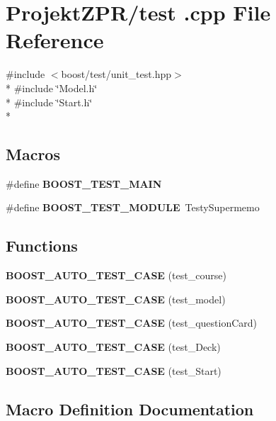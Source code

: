 \section{Projekt\-Z\-P\-R/test .cpp File Reference}
\label{test_01_8cpp}
{\ttfamily \#include $<$boost/test/unit\-\_\-test.\-hpp$>$}\\*
{\ttfamily \#include \char`\"{}Model.\-h\char`\"{}}\\*
{\ttfamily \#include \char`\"{}Start.\-h\char`\"{}}\\*
\subsection*{Macros}
\begin{DoxyCompactItemize}
\item 
\#define {\bf B\-O\-O\-S\-T\-\_\-\-T\-E\-S\-T\-\_\-\-M\-A\-I\-N}
\item 
\#define {\bf B\-O\-O\-S\-T\-\_\-\-T\-E\-S\-T\-\_\-\-M\-O\-D\-U\-L\-E}~Testy\-Supermemo
\end{DoxyCompactItemize}
\subsection*{Functions}
\begin{DoxyCompactItemize}
\item 
{\bf B\-O\-O\-S\-T\-\_\-\-A\-U\-T\-O\-\_\-\-T\-E\-S\-T\-\_\-\-C\-A\-S\-E} (test\-\_\-course)
\item 
{\bf B\-O\-O\-S\-T\-\_\-\-A\-U\-T\-O\-\_\-\-T\-E\-S\-T\-\_\-\-C\-A\-S\-E} (test\-\_\-model)
\item 
{\bf B\-O\-O\-S\-T\-\_\-\-A\-U\-T\-O\-\_\-\-T\-E\-S\-T\-\_\-\-C\-A\-S\-E} (test\-\_\-question\-Card)
\item 
{\bf B\-O\-O\-S\-T\-\_\-\-A\-U\-T\-O\-\_\-\-T\-E\-S\-T\-\_\-\-C\-A\-S\-E} (test\-\_\-\-Deck)
\item 
{\bf B\-O\-O\-S\-T\-\_\-\-A\-U\-T\-O\-\_\-\-T\-E\-S\-T\-\_\-\-C\-A\-S\-E} (test\-\_\-\-Start)
\end{DoxyCompactItemize}


\subsection{Macro Definition Documentation}
